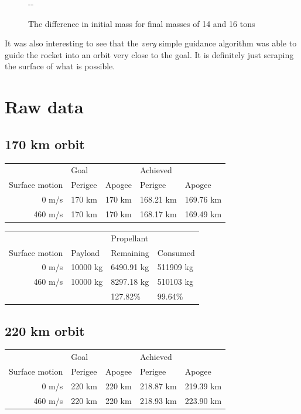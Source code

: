 \documentclass[11pt]{article}
\newlength{\offsetpage}
\newenvironment{widepage}{\begin{adjustwidth}{-\offsetpage}{-\offsetpage}%
    \addtolength{\textwidth}{2\offsetpage}}%
{\end{adjustwidth}}
\begin{document}
\begin{figure}[H]
\begin{widepage}
\begin{minipage}{0.45\textwidth}
      \caption{The difference in initial mass for final masses of 14 and 16 tons}
    \end{minipage}
  \end{widepage}
\end{figure}

It was also interesting to see that the \textit{very} simple guidance algorithm was able to guide the rocket into an orbit very close to the goal.
It is definitely just scraping the surface of what is possible.

\newpage

\appendix

\section{Raw data}
\subsection{170 km orbit}
\begin{center}
  \begin{tabular}{ r | l   l | l   l }
     & Goal  &  & Achieved &  \\
    Surface motion & Perigee & Apogee & Perigee & Apogee \\
    \hline
    0 m/s & 170 km & 170 km & 168.21 km & 169.76 km \\
    460 m/s & 170 km & 170 km & 168.17 km & 169.49 km
  \end{tabular}
\end{center}

\begin{center}
  \begin{tabular}{ r   l   l l }
     &  & Propellant &  \\
    Surface motion & Payload & Remaining & Consumed \\
    \hline
    0 m/s & 10000 kg & 6490.91 kg  & 511909 kg \\
    460 m/s & 10000 kg & 8297.18 kg  & 510103 kg \\
    \hline
      &   & 127.82\%  & 99.64\% \\
  \end{tabular}
\end{center}

\subsection{220 km orbit}
\begin{center}
  \begin{tabular}{ r | l   l | l   l }
     & Goal  &  & Achieved &  \\
    Surface motion & Perigee & Apogee & Perigee & Apogee \\
    \hline
    0 m/s & 220 km & 220 km & 218.87 km & 219.39 km \\
    460 m/s & 220 km & 220 km & 218.93 km & 223.90 km
  \end{tabular}
\end{center}
\end{document}

